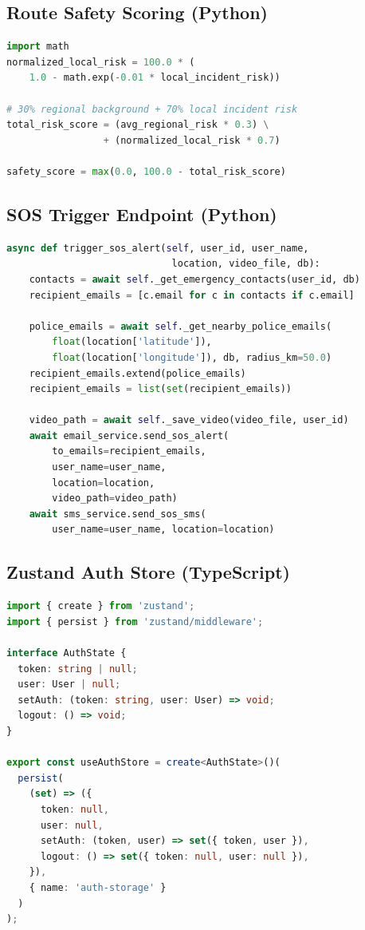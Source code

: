 \documentclass[12pt,a4paper]{report}
\begin{document}
\subsection{Route Safety Scoring (Python)}
\begin{lstlisting}[language=Python, caption={Composite safety score calculation (route\_service.py)}]
import math
normalized_local_risk = 100.0 * (
    1.0 - math.exp(-0.01 * local_incident_risk))

# 30% regional background + 70% local incident risk
total_risk_score = (avg_regional_risk * 0.3) \
                 + (normalized_local_risk * 0.7)

safety_score = max(0.0, 100.0 - total_risk_score)
\end{lstlisting}

\subsection{SOS Trigger Endpoint (Python)}
\begin{lstlisting}[language=Python, caption={SOS alert orchestration (sos\_service.py)}]
async def trigger_sos_alert(self, user_id, user_name,
                             location, video_file, db):
    contacts = await self._get_emergency_contacts(user_id, db)
    recipient_emails = [c.email for c in contacts if c.email]

    police_emails = await self._get_nearby_police_emails(
        float(location['latitude']),
        float(location['longitude']), db, radius_km=50.0)
    recipient_emails.extend(police_emails)
    recipient_emails = list(set(recipient_emails))

    video_path = await self._save_video(video_file, user_id)
    await email_service.send_sos_alert(
        to_emails=recipient_emails,
        user_name=user_name,
        location=location,
        video_path=video_path)
    await sms_service.send_sos_sms(
        user_name=user_name, location=location)
\end{lstlisting}

\subsection{Zustand Auth Store (TypeScript)}
\begin{lstlisting}[language=TypeScript, caption={Zustand state store for authentication (authStore.ts)}]
import { create } from 'zustand';
import { persist } from 'zustand/middleware';

interface AuthState {
  token: string | null;
  user: User | null;
  setAuth: (token: string, user: User) => void;
  logout: () => void;
}

export const useAuthStore = create<AuthState>()(
  persist(
    (set) => ({
      token: null,
      user: null,
      setAuth: (token, user) => set({ token, user }),
      logout: () => set({ token: null, user: null }),
    }),
    { name: 'auth-storage' }
  )
);
\end{lstlisting}
\end{document}
